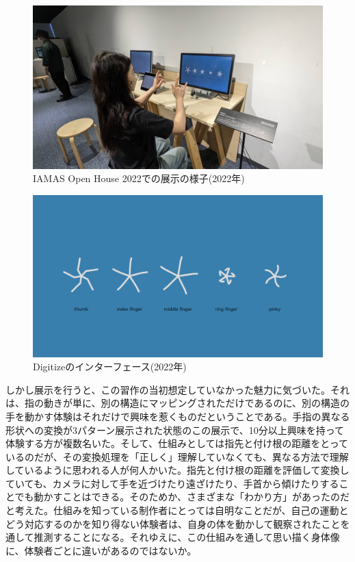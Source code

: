 \begin{figure}[H]
  \centering
  \includegraphics[width=15cm]{img/openhouse2022.jpeg}
  \caption{IAMAS Open House 2022での展示の様子(2022年)}
  \label{fig:exhibit_2022}
\end{figure}

\begin{figure}[H]
  \centering
  \includegraphics[width=15cm]{img/openhouse2022_interface.png}
  \caption{Digitizeのインターフェース(2022年)}
  \label{fig:exhibit_2022_interface}
\end{figure}

しかし展示を行うと、この習作の当初想定していなかった魅力に気づいた。それは、指の動きが単に、別の構造にマッピングされただけであるのに、別の構造の手を動かす体験はそれだけで興味を惹くものだということである。手指の異なる形状への変換が3パターン展示された状態のこの展示で、10分以上興味を持って体験する方が複数名いた。そして、仕組みとしては指先と付け根の距離をとっているのだが、その変換処理を「正しく」理解していなくても、異なる方法で理解しているように思われる人が何人かいた。指先と付け根の距離を評価して変換していても、カメラに対して手を近づけたり遠ざけたり、手首から傾けたりすることでも動かすことはできる。そのためか、さまざまな「わかり方」があったのだと考えた。仕組みを知っている制作者にとっては自明なことだが、自己の運動とどう対応するのかを知り得ない体験者は、自身の体を動かして観察されたことを通して推測することになる。それゆえに、この仕組みを通して思い描く身体像に、体験者ごとに違いがあるのではないか。

